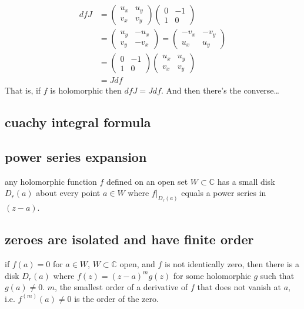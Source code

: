 \begin{align*}
df J&=\begin{pmatrix}u_x&u_y\\ v_x&v_y\end{pmatrix}\begin{pmatrix} 0& -1\\ 1&0\end{pmatrix}\\
&=\begin{pmatrix}u_y&-u_x\\ v_y&-v_x\end{pmatrix}=\begin{pmatrix}-v_x&-v_y\\ u_x&u_y\end{pmatrix}\\
&=\begin{pmatrix}0&-1\\ 1&0\end{pmatrix}\begin{pmatrix}u_x&u_y\\ v_x&v_y\end{pmatrix}\\
&=Jdf
\end{align*}
\fi
That is, if \(f\) is holomorphic then \(df J=J df\). And then there's the converse…

\subsection{cuachy integral formula}

\subsection{power series expansion}

any holomorphic function \(f\) defined on an open set \(W \subset \mathbb{C}\) has a small disk \(D_r(a)\) about every point \(a \in W\) where \(f|_{D_r(a)}\) equals a power series in \((z-a)\).

\subsection{zeroes are isolated and have finite order}

if \(f(a)=0\) for \(a \in W\), \(W \subset \mathbb{C}\) open, and \(f\) is not identically zero, then there is a disk \(D_r(a)\) where \(f(z)=(z-a)^mg(z)\) for some holomorphic \(g\) such that \(g(a)\neq 0\). \(m\), the smallest order of a derivative  of \(f\) that does not vanish at \(a\), i.e. \(f^{(m)}(a)\neq 0\) is the order of the zero. 

